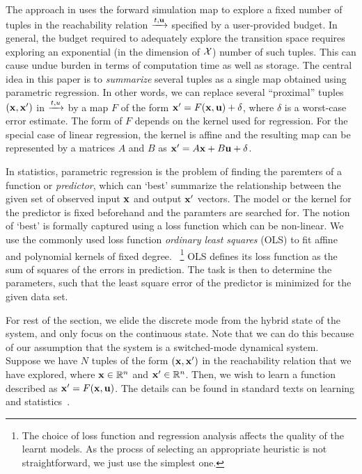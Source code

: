 The approach in \cite{zutshi2014multiple} uses the forward simulation
map to explore a fixed number of tuples in the reachability relation
$\xrightarrow{t,\mathbf{u}}$ specified by a user-provided budget.  In general, the
budget required to adequately explore the transition space requires
exploring an exponential (in the dimension of $\mathcal{X}$) number
of such tuples. This can cause undue burden in terms of computation
time as well as storage.  The central idea in this paper is to {\em
summarize} several tuples as a single map obtained using parametric
regression.  In other words, we can replace several ``proximal''
tuples $(\mathbf{x},\mathbf{x}')$ in $\xrightarrow{t,u}$ by a map $F$ of the form $\mathbf{x}' =
F(\mathbf{x}, \mathbf{u}) + \delta$, where $\delta$ is a worst-case error estimate. The
form of $F$ depends on the kernel used for regression. For the special
case of linear regression, the kernel is affine and the resulting map
can be represented by a matrices $A$ and $B$ as $\mathbf{x}' = A\mathbf{x} + B\mathbf{u} +
\delta$.

In statistics, parametric regression is the problem of finding the
paremters of a function or \textit{predictor}, which can `best'
summarize the relationship between the given set of observed input
$\mathbf{x}$ and output $\mathbf{x}'$ vectors. The model or the kernel for the
predictor is fixed beforehand and the paramters are searched for.  The
notion of `best' is formally captured using a loss function which can
be non-linear. We use the commonly used loss function \textit{ordinary
least squares} (OLS) to fit affine and polynomial kernels of fixed
degree.  ~\footnote{The choice of loss function and regression
analysis affects the quality of the learnt models. As the procss of
selecting an appropriate heuristic is not straightforward, we just use
the simplest one.} OLS defines its loss function as the sum of squares
of the errors in prediction. The task is then to determine the
parameters, such that the least square error of the predictor is
minimized for the given data set.

For rest of the section, we elide the discrete mode from the hybrid
state of the system, and only focus on the continuous state. Note that
we can do this because of our assumption that the system is a
switched-mode dynamical system.  Suppose we have $N$ tuples of the
form $(\mathbf{x},\mathbf{x}')$ in the reachability relation that we have explored,
where $\mathbf{x}\in\mathbb{R}^n$ and $\mathbf{x}'\in\mathbb{R}^n$. Then, we wish to learn a
function described as $\mathbf{x}' = F(\mathbf{x}, \mathbf{u})$.  The details can be found
in standard texts on learning and
statistics~\cite{friedman2001elements}.

